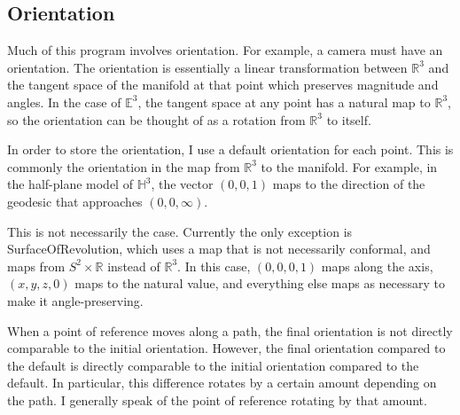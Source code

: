 \subsection{Orientation}

Much of this program involves orientation. For example, a camera must have an orientation.  The orientation is essentially a linear transformation between $\mathbb{R}^3$ and the tangent space of the manifold at that point which preserves magnitude and angles. In the case of $\mathbb{E}^3$, the tangent space at any point has a natural map to $\mathbb{R}^3$, so the orientation can be thought of as a rotation from $\mathbb{R}^3$ to itself.

In order to store the orientation, I use a default orientation for each point. This is commonly the orientation in the map from $\mathbb{R}^3$ to the manifold. For example, in the half-plane model of $\mathbb{H}^3$, the vector $(0,0,1)$ maps to the direction of the geodesic that approaches $(0,0,\infty)$.

This is not necessarily the case. Currently the only exception is SurfaceOfRevolution, which uses a map that is not necessarily conformal, and maps from $S^2 \times \mathbb{R}$ instead of $\mathbb{R}^3$. In this case, $(0,0,0,1)$ maps along the axis, $(x,y,z,0)$ maps to the natural value, and everything else maps as necessary to make it angle-preserving.

When a point of reference moves along a path, the final orientation is not directly comparable to the initial orientation. However, the final orientation compared to the default is directly comparable to the initial orientation compared to the default. In particular, this difference rotates by a certain amount depending on the path. I generally speak of the point of reference rotating by that amount.